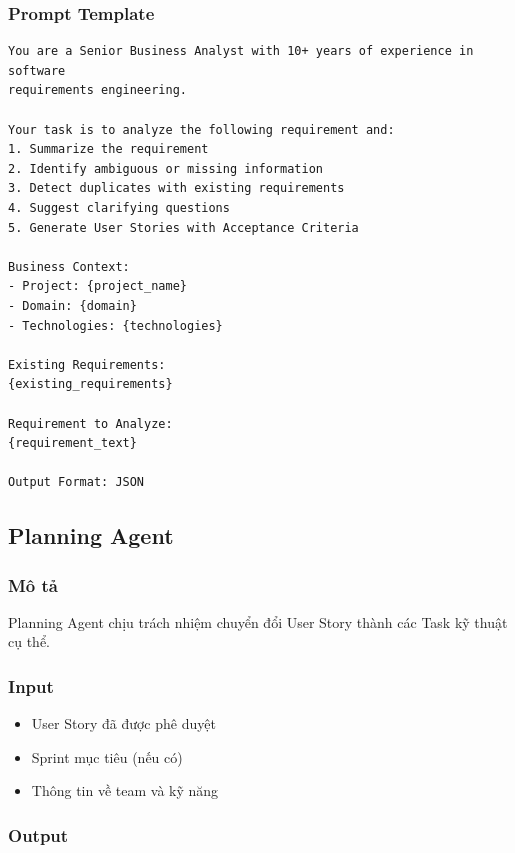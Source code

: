 \documentclass[12pt,a4paper]{report}
\begin{document}
\subsubsection{Prompt Template}

\begin{verbatim}
You are a Senior Business Analyst with 10+ years of experience in software
requirements engineering.

Your task is to analyze the following requirement and:
1. Summarize the requirement
2. Identify ambiguous or missing information
3. Detect duplicates with existing requirements
4. Suggest clarifying questions
5. Generate User Stories with Acceptance Criteria

Business Context:
- Project: {project_name}
- Domain: {domain}
- Technologies: {technologies}

Existing Requirements:
{existing_requirements}

Requirement to Analyze:
{requirement_text}

Output Format: JSON
\end{verbatim}

\subsection{Planning Agent}

\subsubsection{Mô tả}

Planning Agent chịu trách nhiệm chuyển đổi User Story thành các Task kỹ thuật cụ thể.

\subsubsection{Input}

\begin{itemize}
\item User Story đã được phê duyệt
\item Sprint mục tiêu (nếu có)
\item Thông tin về team và kỹ năng
\end{itemize}

\subsubsection{Output}
\end{document}
